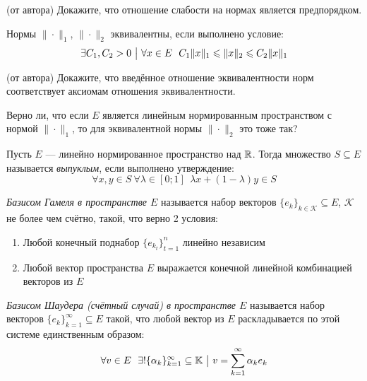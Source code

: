 \begin{exercise} (от автора)
	Докажите, что отношение слабости на нормах является предпорядком.
\end{exercise}

\begin{definition}
	Нормы $\|\cdot\|_1$, $\|\cdot\|_2$ эквивалентны, если выполнено условие:
	\[
		\exists C_1, C_2 > 0 \such \forall x \in E\ \ C_1\|x\|_1 \le \|x\|_2 \le C_2\|x\|_1
	\]
\end{definition}

\begin{exercise} (от автора)
	Докажите, что введённое отношение эквивалентности норм соответствует аксиомам отношения эквивалентности.
\end{exercise}

\begin{exercise}
	Верно ли, что если $E$ является линейным нормированным пространством с нормой $\|\cdot\|_1$, то для эквивалентной нормы $\|\cdot\|_2$ это тоже так?
\end{exercise}

\begin{definition}
	Пусть $E$ --- линейно нормированное пространство над $\mathbb{R}$. Тогда множество $S \subseteq E$ называется \textit{выпуклым}, если выполнено утверждение:
	\[
		\forall x, y \in S\ \forall \lambda \in [0; 1]\ \ \lambda x + (1 - \lambda)y \in S
	\]
\end{definition}

\begin{definition}
	\textit{Базисом Гамеля в пространстве $E$} называется набор векторов $\{e_k\}_{k \in \mathcal{K}} \subseteq E$, $\mathcal{K}$ не более чем счётно, такой, что верно 2 условия:
	\begin{enumerate}
		\item Любой конечный поднабор $\{e_{k_t}\}_{t = 1}^n$ линейно независим
		
		\item Любой вектор пространства $E$ выражается конечной линейной комбинацией векторов из $E$
	\end{enumerate}
\end{definition}

\begin{definition}
	\textit{Базисом Шаудера (счётный случай) в пространстве $E$} называется набор векторов $\{e_k\}_{k = 1}^\infty \subseteq E$ такой, что любой вектор из $E$ раскладывается по этой системе единственным образом:
	\[
		\forall v \in E\ \ \exists! \{\alpha_k\}_{k = 1}^\infty \subseteq \mathbb{K} \ \big|\  v = \sum_{k = 1}^\infty \alpha_ke_k
	\]
\end{definition}

